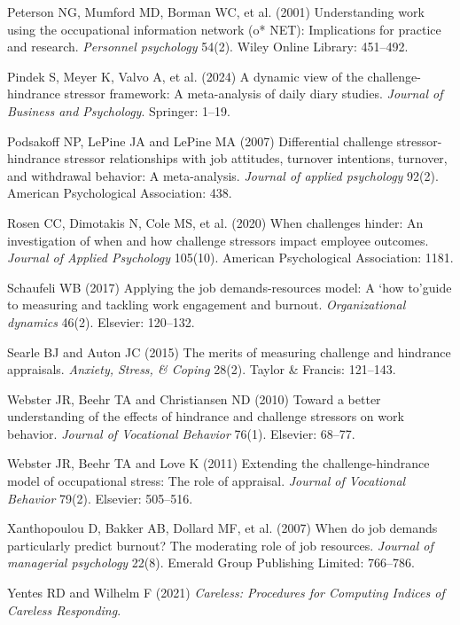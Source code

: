 \documentclass[
  man]{apa7}
\newlength{\cslhangindent}
\newlength{\cslentryspacingunit} %
\newenvironment{CSLReferences}[2] %
 {%
  \setlength{\parindent}{0pt}
  \ifodd #1
  \let\oldpar\par
  \def\par{\hangindent=\cslhangindent\oldpar}
  \fi
  \setlength{\parskip}{#2\cslentryspacingunit}
 }%
 {}
\begin{document}
\begin{CSLReferences}{1}{0}
\leavevmode{}%
Peterson NG, Mumford MD, Borman WC, et al. (2001) Understanding work using the occupational information network (o* NET): Implications for practice and research. \emph{Personnel psychology} 54(2). Wiley Online Library: 451--492.

\leavevmode{}%
Pindek S, Meyer K, Valvo A, et al. (2024) A dynamic view of the challenge-hindrance stressor framework: A meta-analysis of daily diary studies. \emph{Journal of Business and Psychology}. Springer: 1--19.

\leavevmode{}%
Podsakoff NP, LePine JA and LePine MA (2007) Differential challenge stressor-hindrance stressor relationships with job attitudes, turnover intentions, turnover, and withdrawal behavior: A meta-analysis. \emph{Journal of applied psychology} 92(2). American Psychological Association: 438.

\leavevmode{}%
Rosen CC, Dimotakis N, Cole MS, et al. (2020) When challenges hinder: An investigation of when and how challenge stressors impact employee outcomes. \emph{Journal of Applied Psychology} 105(10). American Psychological Association: 1181.

\leavevmode{}%
Schaufeli WB (2017) Applying the job demands-resources model: A `how to'guide to measuring and tackling work engagement and burnout. \emph{Organizational dynamics} 46(2). Elsevier: 120--132.

\leavevmode{}%
Searle BJ and Auton JC (2015) The merits of measuring challenge and hindrance appraisals. \emph{Anxiety, Stress, \& Coping} 28(2). Taylor \& Francis: 121--143.

\leavevmode{}%
Webster JR, Beehr TA and Christiansen ND (2010) Toward a better understanding of the effects of hindrance and challenge stressors on work behavior. \emph{Journal of Vocational Behavior} 76(1). Elsevier: 68--77.

\leavevmode{}%
Webster JR, Beehr TA and Love K (2011) Extending the challenge-hindrance model of occupational stress: The role of appraisal. \emph{Journal of Vocational Behavior} 79(2). Elsevier: 505--516.

\leavevmode{}%
Xanthopoulou D, Bakker AB, Dollard MF, et al. (2007) When do job demands particularly predict burnout? The moderating role of job resources. \emph{Journal of managerial psychology} 22(8). Emerald Group Publishing Limited: 766--786.

\leavevmode{}%
Yentes RD and Wilhelm F (2021) \emph{Careless: Procedures for Computing Indices of Careless Responding}.

\end{CSLReferences}

\endgroup
\end{document}
